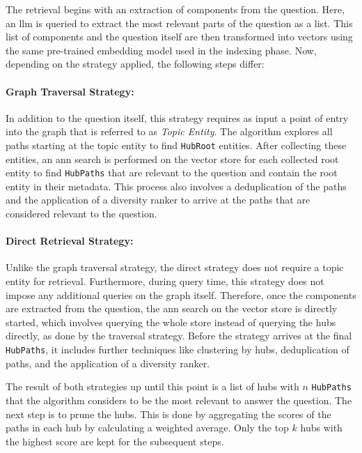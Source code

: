 The retrieval begins with an extraction of components from the question. Here, an \gls{llm} is queried to extract the most relevant parts of the question as a list. This list of components and the question itself are then transformed into vectors using the same pre-trained embedding model used in the indexing phase. Now, depending on the strategy applied, the following steps differ:

\paragraph{Graph Traversal Strategy:} In addition to the question itself, this strategy requires as input a point of entry into the graph that is referred to as \emph{Topic Entity}. The algorithm explores all paths starting at the topic entity to find \texttt{HubRoot} entities. After collecting these entities, an \gls{ann} search is performed on the vector store for each collected root entity to find \texttt{HubPaths} that are relevant to the question and contain the root entity in their metadata. This process also involves a deduplication of the paths and the application of a diversity ranker to arrive at the paths that are considered relevant to the question.

\paragraph{Direct Retrieval Strategy:} Unlike the graph traversal strategy, the direct strategy does not require a topic entity for retrieval. Furthermore, during query time, this strategy does not impose any additional queries on the graph itself. Therefore, once the components are extracted from the question, the \gls{ann} search on the vector store is directly started, which involves querying the whole store instead of querying the hubs directly, as done by the traversal strategy. Before the strategy arrives at the final \texttt{HubPaths}, it includes further techniques like clustering by hubs, deduplication of paths, and the application of a diversity ranker. 

The result of both strategies up until this point is a list of hubs with \(n\) \texttt{HubPaths} that the algorithm considers to be the most relevant to answer the question. The next step is to prune the hubs. This is done by aggregating the scores of the paths in each hub by calculating a weighted average. Only the top \(k\) hubs with the highest score are kept for the subsequent steps. 

